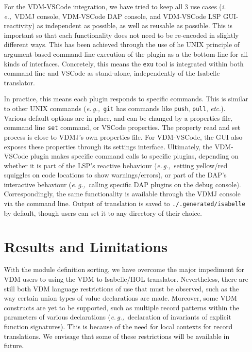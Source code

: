 \documentclass[runningheads,a4paper]{llncs}
\newcommand{\eg}{{\em e.\,g.,\/}}
\newcommand{\ie}{{\em i.\,e.,\/}}
\newcommand{\etc}{{\em etc.\/}}
\begin{document}
For the VDM-VSCode integration, we have tried to keep all \(3\) use cases (\ie~VDMJ console, VDM-VSCode DAP console, and VDM-VSCode LSP GUI-reactivity) as independent as possible, as well as reusable as possible. This is important so that each functionality does not need to be re-encoded in slightly different ways. This has been achieved through the use of he UNIX principle of argument-based command-line execution of the plugin as a the bottom-line for all kinds of interfaces. Concretely, this means the \texttt{exu} tool is integrated within both command line and VSCode as stand-alone, independently of the Isabelle translator. 

In practice, this means each plugin responds to specific commands. This is similar to other UNIX commands (\eg~\texttt{git} has commands like \texttt{push}, \texttt{pull}, \etc). Various default options are in place, and can be changed by a properties file, command line \texttt{set} command, or VSCode properties. The property read and set process is close to VDMJ's own properties file. For VDM-VSCode, the GUI also exposes these properties through its settings interface. Ultimately, the VDM-VSCode plugin makes specific command calls to specific plugins, depending on whether it is part of the LSP's reactive behaviour  (\eg~setting yellow/red squiggles on code locations to show warnings/errors), or part of the DAP's interactive behaviour (\eg~calling specific DAP plugins on the debug console). Correspondingly, the same functionality is available through the VDMJ console via the command line. Output of translation is saved to \texttt{./.generated/isabelle} by default, though users can set it to any directory of their choice. 

\section{Results and Limitations}\label{sec:Examples}

With the module definition sorting, we have overcome the major impediment for VDM users to using the VDM to Isabelle/HOL translator. Nevertheless, there are still both VDM language restrictions of use that must be observed, such as the way certain union types of value declarations are made. Moreover, some VDM constructs are yet to be supported, such as multiple record patterns within the parameters of various declarations (\eg~declaration of invariants of explicit function signatures). This is because of the need for local contexts for record translations. We envisage that some of these restrictions will be available in future. 
\end{document}
